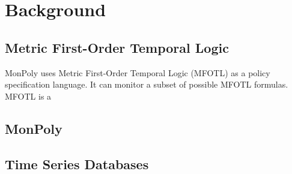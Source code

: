 \section{Background}

\subsection{Metric First-Order Temporal Logic}
MonPoly uses Metric First-Order Temporal Logic (MFOTL) \cite{Basin2015, Chomicki1995} as a policy specification language. %
It can monitor a subset of possible MFOTL formulas.
MFOTL is a 

\subsection{MonPoly}


\subsection{Time Series Databases}